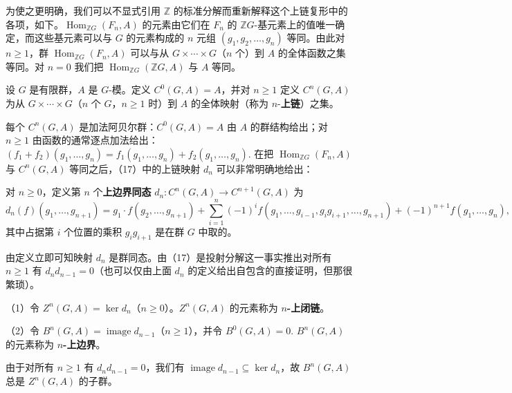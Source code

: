 为使之更明确，我们可以不显式引用 \(\mathbb{Z}\) 的标准分解而重新解释这个上链复形中的各项，如下。\(\operatorname{Hom}_{\mathbb{Z}G}(F_n, A)\) 的元素由它们在 \(F_n\) 的 \(\mathbb{Z}G\)-基元素上的值唯一确定，而这些基元素可以与 \(G\) 的元素构成的 \(n\) 元组 \((g_1, g_2, \ldots, g_n)\) 等同。由此对 \(n \geq 1\)，群 \(\operatorname{Hom}_{\mathbb{Z}G}(F_n, A)\) 可以与从 \(G \times \cdots \times G\)（\(n\) 个）到 \(A\) 的全体函数之集等同。对 \(n = 0\) 我们把 \(\operatorname{Hom}_{\mathbb{Z}G}(\mathbb{Z}G, A)\) 与 \(A\) 等同。

\begin{definition}
设 \(G\) 是有限群，\(A\) 是 \(G\)-模。定义 \(C^0(G, A) = A\)，并对 \(n \geq 1\) 定义 \(C^n(G, A)\) 为从 \(G \times \cdots \times G\)（\(n\) 个 \(G\)，\(n \geq 1\) 时）到 \(A\) 的全体映射（称为 \(n\)-\textbf{上链}）之集。
\end{definition}

每个 \(C^n(G, A)\) 是加法阿贝尔群：\(C^0(G, A) = A\) 由 \(A\) 的群结构给出；对 \(n \geq 1\) 由函数的通常逐点加法给出：\((f_1+f_2)(g_1, \ldots, g_n) = f_1(g_1, \ldots, g_n)+f_2(g_1, \ldots, g_n)\). 在把 \(\operatorname{Hom}_{\mathbb{Z}G}(F_n, A)\) 与 \(C^n(G, A)\) 等同之后，（17）中的上链映射 \(d_n\) 可以非常明确地给出：

\begin{definition}
对 \(n \geq 0\)，定义第 \(n\) 个\textbf{上边界同态} \(d_n : C^n(G, A) \to C^{n+1}(G, A)\) 为
\[
d_n(f)(g_1, \ldots, g_{n+1}) = g_1 \cdot f(g_2, \ldots, g_{n+1})+\sum_{i=1}^{n}(-1)^if(g_1, \ldots, g_{i-1}, g_ig_{i+1}, \ldots, g_{n+1})+(-1)^{n+1}f(g_1, \ldots, g_n), \tag{17.18}
\]
其中占据第 \(i\) 个位置的乘积 \(g_ig_{i+1}\) 是在群 \(G\) 中取的。
\end{definition}

由定义立即可知映射 \(d_n\) 是群同态。由（17）是投射分解这一事实推出对所有 \(n \geq 1\) 有 \(d_nd_{n-1} = 0\)（也可以仅由上面 \(d_n\) 的定义给出自包含的直接证明，但那很繁琐）。

\begin{definition}
（1）令 \(Z^n(G, A) = \ker d_n\)（\(n \geq 0\)）。\(Z^n(G, A)\) 的元素称为 \textbf{\(n\)-上闭链}。

（2）令 \(B^n(G, A) = \operatorname{image}d_{n-1}\)（\(n \geq 1\)），并令 \(B^0(G, A) = 0\). \(B^n(G, A)\) 的元素称为 \textbf{\(n\)-上边界}。
\end{definition}

由于对所有 \(n \geq 1\) 有 \(d_nd_{n-1} = 0\)，我们有 \(\operatorname{image}d_{n-1} \subseteq \ker d_n\)，故 \(B^n(G, A)\) 总是 \(Z^n(G, A)\) 的子群。

